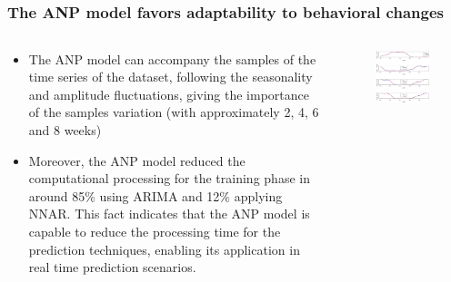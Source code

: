 \documentclass[aspectratio=169]{beamer}
\begin{document}
\subsection{}
\begin{frame}
\frametitle{The ANP model favors adaptability to behavioral changes}
\small

\begin{columns}[T] %
\begin{column}{.4\textwidth}
\begin{itemize}\footnotesize
    \item The ANP model can accompany the samples of the time series of the dataset, following the seasonality and amplitude fluctuations, giving the importance of the samples variation (with approximately 2, 4, 6 and 8 weeks)
    \item Moreover, the ANP model reduced the computational processing for the training phase in around 85\% using ARIMA and 12\% applying NNAR. This fact indicates that the ANP model is capable to reduce the processing time for the prediction techniques, enabling its application in real time prediction scenarios.
\end{itemize}
\end{column}%

\hfill%

\begin{column}{.6\textwidth}
\centering
\begin{figure}[!htb]
\centering
\includegraphics[height=0.7\textwidth,angle=0]{figura7.png}
\end{figure}
\end{column}%
\end{columns}

\end{frame}
\end{document}
